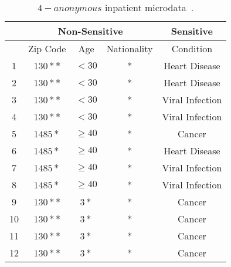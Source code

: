 \begin{table}[htbp]
    \centering
    \begin{tabular}{|c||c|c|c||c|}
        \hline \multicolumn{1}{|c||}{} & \multicolumn{3}{c||}{ Non-Sensitive } & Sensitive                                 \\
        \hline                         & Zip Code                              & Age       & Nationality & Condition       \\
        \hline 1                       & $130**$                               & $<30$     & *           & Heart Disease   \\
        2                              & $130**$                               & $<30$     & *           & Heart Disease   \\
        3                              & $130**$                               & $<30$     & *           & Viral Infection \\
        4                              & $130**$                               & $<30$     & *           & Viral Infection \\
        \hline 5                       & $1485*$                               & $\geq 40$ & *           & Cancer          \\
        6                              & $1485*$                               & $\geq 40$ & *           & Heart Disease   \\
        7                              & $1485*$                               & $\geq 40$ & *           & Viral Infection \\
        8                              & $1485*$                               & $\geq 40$ & *           & Viral Infection \\
        \hline 9                       & $130**$                               & $3*$      & *           & Cancer          \\
        10                             & $130**$                               & $3*$      & *           & Cancer          \\
        11                             & $130**$                               & $3*$      & *           & Cancer          \\
        12                             & $130**$                               & $3*$      & *           & Cancer          \\
        \hline
    \end{tabular}
    \caption{$4-anonymous$ inpatient microdata~\cite{machanavajjhala2007diversity}.}
    \label{tabular:4-anonymousinpatientmicrodata}
\end{table}
\FloatBarrier


